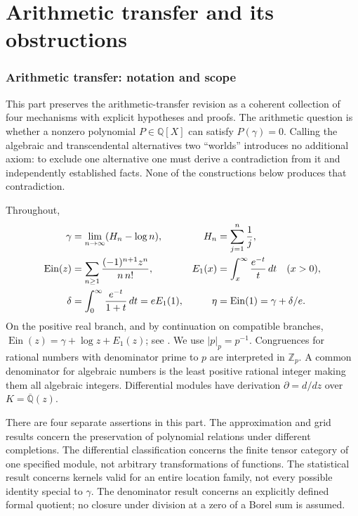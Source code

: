 \documentclass[11pt,a4paper]{article}
\newcommand{\Q}{\mathbb Q}
\newcommand{\Z}{\mathbb Z}
\newcommand{\Qbar}{\overline{\mathbb Q}}
\newcommand{\Ein}{\operatorname{Ein}}
\theoremstyle{definition}
\theoremstyle{remark}
\numberwithin{equation}{section}
\begin{document}

\clearpage
\part{Arithmetic transfer and its obstructions}\label{master:transfer}
\section{Arithmetic transfer: notation and scope}
\label{at:sec:introduction}

This part preserves the arithmetic-transfer revision as a coherent
collection of four mechanisms with explicit hypotheses and proofs. The
arithmetic question is whether a nonzero polynomial $P\in\Q[X]$ can satisfy
$P(\gamma)=0$. Calling the algebraic and transcendental alternatives two
``worlds'' introduces no additional axiom: to exclude one alternative one
must derive a contradiction from it and independently established facts.
None of the constructions below produces that contradiction.

Throughout,
\begin{align}
 \gamma&=\lim_{n\to\infty}(H_n-\log n),& H_n&=\sum_{j=1}^n\frac1j,\notag\\
 \Ein(z)&=\sum_{n\ge1}\frac{(-1)^{n+1}z^n}{n\,n!},&
 E_1(x)&=\int_x^\infty\frac{e^{-t}}t\,dt\quad(x>0),\label{at:eq:notation}\\
 \delta&=\int_0^\infty\frac{e^{-t}}{1+t}\,dt=eE_1(1),&
 \eta&=\Ein(1)=\gamma+\delta/e.\notag
\end{align}
On the positive real branch, and by continuation on compatible branches,
$\Ein(z)=\gamma+\log z+E_1(z)$; see \cite{at:DLMF}.
We use $|p|_p=p^{-1}$. Congruences for rational numbers with denominator
prime to $p$ are interpreted in $\Z_p$. A common denominator for algebraic
numbers is the least positive rational integer making them all algebraic
integers. Differential modules have derivation $\partial=d/dz$ over
$K=\Qbar(z)$.

There are four separate assertions in this part. The approximation and
grid results concern the preservation of polynomial relations under
different completions. The differential classification concerns the finite
tensor category of one specified module, not arbitrary transformations of
functions. The statistical result concerns kernels valid for an entire
location family, not every possible identity special to $\gamma$. The
denominator result concerns an explicitly defined formal quotient; no
closure under division at a zero of a Borel sum is assumed.
\end{document}
